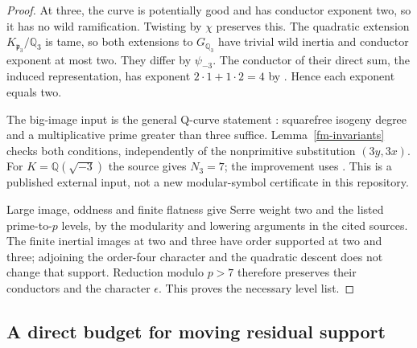 \begin{proof}
At three, the curve is potentially good and has conductor exponent two,
so it has no wild ramification. Twisting by $\chi$ preserves this.
The quadratic extension $K_{\mathfrak p_3}/\mathbb Q_3$ is tame, so both
extensions to $G_{\mathbb Q_3}$ have trivial wild inertia and conductor
exponent at most two. They differ by $\psi_{-3}$. The conductor of their
direct sum, the induced representation, has exponent
$2\cdot1+1\cdot2=4$ by
\cite[Theorem~4.1]{PacettiVillagra2022QCurves}. Hence each exponent
equals two.

The big-image input is the general Q-curve statement
\cite[Theorem~5.2]{PacettiVillagra2022QCurves}: squarefree isogeny degree
and a multiplicative prime greater than three suffice. Lemma~\ref{fm-invariants}
checks both conditions, independently of the nonprimitive substitution
$(3y,3x)$. For $K=\mathbb Q(\sqrt{-3})$ the source gives $N_3=7$;
the improvement uses
\cite[Proposition~5.4]{Koutsianas2020GeneralizedFermat}.
This is a published external input, not a new modular-symbol certificate
in this repository.

Large image, oddness and finite flatness give Serre weight two and the
listed prime-to-$p$ levels, by the modularity and lowering arguments in
the cited sources. The finite inertial images at two and three have
order supported at two and three; adjoining the order-four character
and the quadratic descent does not change that support. Reduction
modulo $p>7$ therefore preserves their conductors and the character
$\epsilon$. This proves the necessary level list.
\end{proof}

\subsection{A direct budget for moving residual support}


